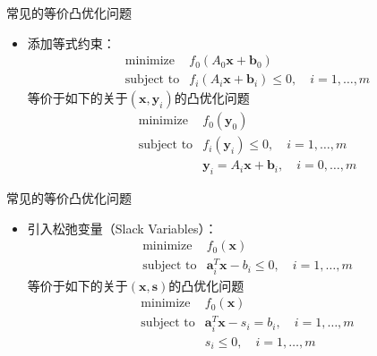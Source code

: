 \documentclass[10pt]{beamer}
\begin{document}
\begin{frame}

\begin{block}{常见的等价凸优化问题}
\begin{itemize}
\item 添加等式约束：
\begin{eqnarray*}
& \text{minimize} & f_0(A_0\mathbf{x} + \mathbf{b}_0) \\
& \text{subject to} & f_i(A_i\mathbf{x} + \mathbf{b}_i) \le 0, \quad i = 1,\ldots,m
\end{eqnarray*}
等价于如下的关于$(\mathbf{x},\mathbf{y}_i)$的凸优化问题
\begin{eqnarray*}
& \text{minimize} & f_0(\mathbf{y}_0) \\
& \text{subject to} & f_i(\mathbf{y}_i) \le 0, \quad i = 1,\ldots,m \\
& & \mathbf{y}_i = A_i\mathbf{x} + \mathbf{b}_i, \quad i = 0,\ldots,m
\end{eqnarray*}
\end{itemize}
\end{block}

\end{frame}


\begin{frame}

\begin{block}{常见的等价凸优化问题}
\begin{itemize}
\item 引入松弛变量（Slack Variables）：
\begin{eqnarray*}
& \text{minimize} & f_0(\mathbf{x}) \\
& \text{subject to} & \mathbf{a}_i^T\mathbf{x} - b_i \le 0, \quad i = 1,\ldots,m
\end{eqnarray*}
等价于如下的关于$(\mathbf{x},\mathbf{s})$的凸优化问题
\begin{eqnarray*}
& \text{minimize} & f_0(\mathbf{x}) \\
& \text{subject to} & \mathbf{a}_i^T\mathbf{x} - s_i = b_i, \quad i = 1,\ldots,m \\
& & s_i \le 0, \quad i = 1,\ldots,m
\end{eqnarray*}
\end{itemize}
\end{block}

\end{frame}

\end{document}
